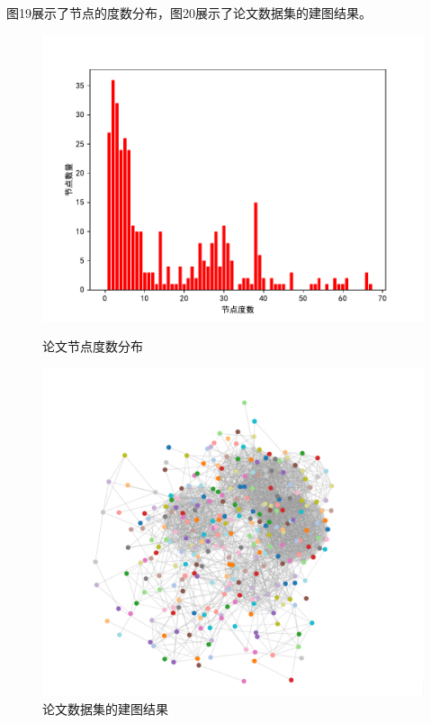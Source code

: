 \documentclass[UTF8, onecolumn, a4paper]{article}
\begin{document}
    图19展示了节点的度数分布，图20展示了论文数据集的建图结果。
\begin{center}
	\begin{figure}[ht] %
		\centering %
		\begin{minipage}[b]{0.95\linewidth} %
			\begin{minipage}[b]{0.47\linewidth} %
				\centering
				\includegraphics[width=\linewidth]{../pictures/paper_degree}
				\caption{论文节点度数分布}
			\end{minipage}
			\hfill
			\begin{minipage}[b]{0.46\linewidth}
				\centering
				\includegraphics[width=\linewidth]{../pictures/show15}
				\caption{论文数据集的建图结果}
			\end{minipage}
		\end{minipage}
	\end{figure}
\end{center}
\end{document}
